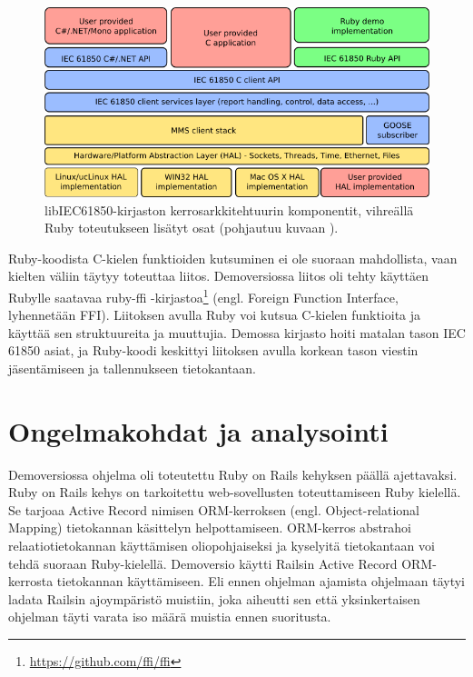 \begin{figure}[ht!]
	\includegraphics[width=1\textwidth]{pictures/libiec61850-layer-architecture.png}
	\caption{libIEC61850-kirjaston kerrosarkkitehtuurin komponentit, vihreällä Ruby toteutukseen lisätyt osat (pohjautuu kuvaan \cite{libIEC61850-api-overview}).}
	\label{fig:libiec61850-layer-architecture}
\end{figure}

Ruby-koodista C-kielen funktioiden kutsuminen ei ole suoraan mahdollista, vaan kielten väliin täytyy toteuttaa liitos. Demoversiossa liitos oli tehty käyttäen Rubylle saatavaa ruby-ffi -kirjastoa\footnote{\url{https://github.com/ffi/ffi}} (engl. Foreign Function Interface, lyhennetään FFI). Liitoksen avulla Ruby voi kutsua C-kielen funktioita ja käyttää sen struktuureita ja muuttujia. Demossa kirjasto hoiti matalan tason IEC 61850 asiat, ja Ruby-koodi keskittyi liitoksen avulla korkean tason viestin jäsentämiseen ja tallennukseen tietokantaan.


\section{Ongelmakohdat ja analysointi}
\label{ch:ongelmakohdat-ja-analysointi}
Demoversiossa ohjelma oli toteutettu Ruby on Rails kehyksen päällä ajettavaksi. Ruby on Rails kehys on tarkoitettu web-sovellusten toteuttamiseen Ruby kielellä. Se tarjoaa Active Record nimisen ORM-kerroksen (engl. Object-relational Mapping) tietokannan käsittelyn helpottamiseen. ORM-kerros abstrahoi relaatiotietokannan käyttämisen oliopohjaiseksi ja kyselyitä tietokantaan voi tehdä suoraan Ruby-kielellä. Demoversio käytti Railsin Active Record ORM-kerrosta tietokannan käyttämiseen. Eli ennen ohjelman ajamista ohjelmaan täytyi ladata Railsin ajoympäristö muistiin, joka aiheutti sen että yksinkertaisen ohjelman täyti varata iso määrä muistia ennen suoritusta.

